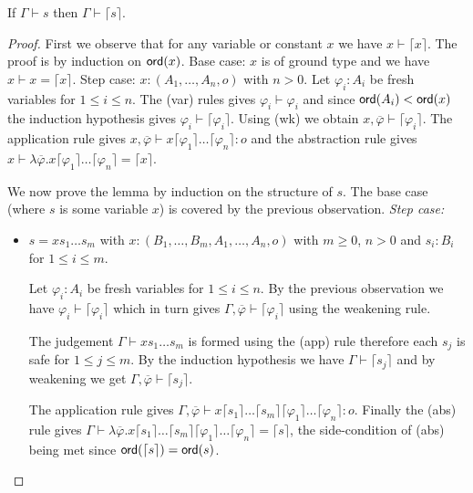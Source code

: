 \documentclass{llncs}
\newcommand{\elnf}[1]{\lceil #1\rceil} %
\newcommand\ord[1]{{\sf ord}(#1)}
\begin{document}

\begin{lemma}
\label{lem:elnf_preserves_safety}
If $\Gamma \vdash s$ then $\Gamma \vdash \elnf{s}$.
\end{lemma}
\begin{proof}

First we observe that for any variable or constant $x$ we have $x \vdash \elnf{x}$. The proof is by induction on $\ord{x}$. Base case: $x$ is of ground type and we have $x \vdash x = \elnf{x}$. Step case:
$x:(A_1, \ldots, A_n,o)$ with $n>0$. Let $\varphi_i:A_i$ be fresh variables for $1\leq i\leq n$. The (var) rules gives $\varphi_i  \vdash \varphi_i$ and since $\ord{A_i} < \ord{x}$ the induction hypothesis gives $\varphi_i \vdash \elnf{\varphi_i}$. Using (wk) we obtain $x, \overline{\varphi} \vdash \elnf{\varphi_i}$.
The application rule gives $x, \overline{\varphi} \vdash x \elnf{\varphi_1} \ldots \elnf{\varphi_n} : o$ and the abstraction rule gives $ x \vdash \lambda \overline{\varphi} . x \elnf{\varphi_1} \ldots \elnf{\varphi_n} = \elnf{x}$.


We now prove the lemma by induction on the structure of $s$.
The base case (where $s$ is some variable $x$) is covered by the previous observation.
\emph{Step case:} 
\begin{itemize}
\item $s = x s_1 \ldots s_m$ with $x: (B_1, \ldots, B_m, A_1, \ldots, A_n, o)$ with $m\geq 0$, $n>0$ and $s_i : B_i$ for $1 \leq i \leq m$. 

Let $\varphi_i: A_i$ be fresh variables for $1\leq i \leq n$. By the previous observation we have $\varphi_i \vdash \elnf{\varphi_i}$ which in turn gives $\Gamma , \overline{\varphi} \vdash \elnf{\varphi_i}$ using the weakening rule.

The judgement $\Gamma \vdash x s_1 \ldots s_m$ is formed using the (app) rule therefore each $s_j$ is safe for $1\leq j \leq m$. By the induction hypothesis we have $\Gamma \vdash \elnf{s_j}$ and by weakening we get $\Gamma, \overline{\varphi} \vdash \elnf{s_j}$.

The application rule gives $\Gamma, \overline{\varphi} \vdash 
x \elnf{s_1} \ldots \elnf{s_m} \elnf{\varphi_1} \ldots \elnf{\varphi_n} : o$. Finally the (abs) rule gives $\Gamma \vdash \lambda \overline{\varphi} . x \elnf{s_1} \ldots \elnf{s_m}  \elnf{\varphi_1} \ldots \elnf{\varphi_n} = \elnf{s}$, the side-condition of (abs) being met since $\ord{\elnf{s}} = \ord{s}$.



\end{itemize}
\end{proof}
\end{document}
